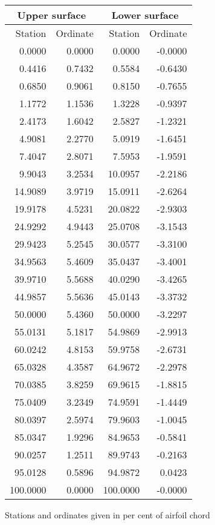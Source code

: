 \documentclass[11pt]{book}
\begin{document}
 \hspace{4mm}
 \begin{tabular}{|r|r|r|r|} \hline 
 \multicolumn{2}{|c|}{Upper surface} & \multicolumn{2}{|c|}{Lower surface} \\
 \hline
 Station & Ordinate & Station & Ordinate \\
 \hline
0.0000 & 0.0000 & 0.0000 & -0.0000 \\
0.4416 & 0.7432 & 0.5584 & -0.6430 \\
0.6850 & 0.9061 & 0.8150 & -0.7655 \\
1.1772 & 1.1536 & 1.3228 & -0.9397 \\
2.4173 & 1.6042 & 2.5827 & -1.2321 \\
4.9081 & 2.2770 & 5.0919 & -1.6451 \\
7.4047 & 2.8071 & 7.5953 & -1.9591 \\
9.9043 & 3.2534 & 10.0957 & -2.2186 \\
14.9089 & 3.9719 & 15.0911 & -2.6264 \\
19.9178 & 4.5231 & 20.0822 & -2.9303 \\
24.9292 & 4.9443 & 25.0708 & -3.1543 \\
29.9423 & 5.2545 & 30.0577 & -3.3100 \\
34.9563 & 5.4609 & 35.0437 & -3.4001 \\
39.9710 & 5.5688 & 40.0290 & -3.4265 \\
44.9857 & 5.5636 & 45.0143 & -3.3732 \\
50.0000 & 5.4360 & 50.0000 & -3.2297 \\
55.0131 & 5.1817 & 54.9869 & -2.9913 \\
60.0242 & 4.8153 & 59.9758 & -2.6731 \\
65.0328 & 4.3587 & 64.9672 & -2.2978 \\
70.0385 & 3.8259 & 69.9615 & -1.8815 \\
75.0409 & 3.2349 & 74.9591 & -1.4449 \\
80.0397 & 2.5974 & 79.9603 & -1.0045 \\
85.0347 & 1.9296 & 84.9653 & -0.5841 \\
90.0257 & 1.2511 & 89.9743 & -0.2163 \\
95.0128 & 0.5896 & 94.9872 & 0.0423 \\
100.0000 & 0.0000 & 100.0000 & -0.0000 \\
 \hline 
 \end{tabular}
 \vspace{8mm}

Stations and ordinates given in per cent of airfoil chord
\end{document}
